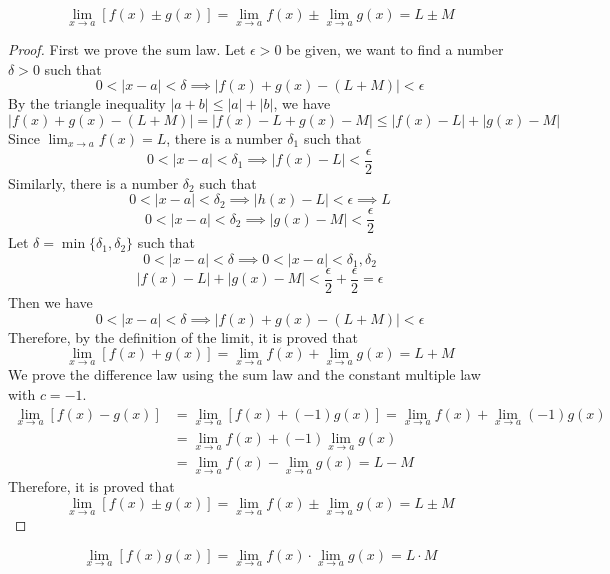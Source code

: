 \begin{theorem}
    \[\lim_{x\to a}[f(x)\pm g(x)]=\lim_{x\to a}f(x)\pm\lim_{x\to a}g(x)
    =L\pm M\]
\end{theorem}
\begin{proof}
    First we prove the sum law.
    Let \(\epsilon>0\) be given, we want to find a number \(\delta>0\) such
    that
    \[0<|x-a|<\delta\implies|f(x)+g(x)-(L+M)|<\epsilon\]
    By the triangle inequality \(|a+b|\leq|a|+|b|\), we have
    \[|f(x)+g(x)-(L+M)|=|f(x)-L+g(x)-M|\leq|f(x)-L|+|g(x)-M|\]
    Since \(\lim_{x\to a}f(x)=L\), there is a number \(\delta_1\) such that
    \[0<|x-a|<\delta_1\implies|f(x)-L|<\frac{\epsilon}{2}\]
    Similarly, there is a number \(\delta_2\) such that
    \[0<|x-a|<\delta_2\implies|h(x)-L|<\epsilon\implies L\]
    \[0<|x-a|<\delta_2\implies|g(x)-M|<\frac{\epsilon}{2}\]
    Let \(\delta=\min\{\delta_1,\delta_2\}\) such that
    \[0<|x-a|<\delta\implies0<|x-a|<\delta_1,\delta_2\]
    \[|f(x)-L|+|g(x)-M|<\frac{\epsilon}{2}+\frac{\epsilon}{2}=\epsilon\]
    Then we have
    \[0<|x-a|<\delta\implies|f(x)+g(x)-(L+M)|<\epsilon\]
    Therefore, by the definition of the limit, it is proved that
    \[\lim_{x\to a}[f(x)+g(x)]=\lim_{x\to a}f(x)+\lim_{x\to a}g(x)=L+M\]
    We prove the difference law using the sum law and the constant multiple
    law with \(c=-1\).
    \begin{align*}
        \lim_{x\to a}[f(x)-g(x)]&=\lim_{x\to a}[f(x)+(-1)g(x)]
        =\lim_{x\to a}f(x)+\lim_{x\to a}(-1)g(x) \\
        &=\lim_{x\to a}f(x)+(-1)\lim_{x\to a}g(x) \\
        &=\lim_{x\to a}f(x)-\lim_{x\to a}g(x) = L-M
    \end{align*}
    Therefore, it is proved that
    \[\lim_{x\to a}[f(x)\pm g(x)]=\lim_{x\to a}f(x)\pm\lim_{x\to a}g(x)
    =L\pm M\]
\end{proof}
\begin{theorem}
    \[\lim_{x\to a}[f(x)g(x)]=\lim_{x\to a}f(x)\cdot\lim_{x\to a}g(x)
    =L\cdot M\]
\end{theorem}
